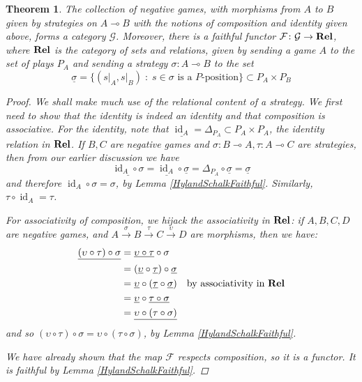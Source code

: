 \documentclass[11pt]{article} %
\theoremstyle{plain} %
\newtheorem{theorem}{Theorem}[section]
\theoremstyle{definition} %
\theoremstyle{note}
\theoremstyle{exercisestyle}
\newcommand{\catname}[1]{{\normalfont\textbf{#1}}}
\newcommand{\Rel}{\catname{Rel}}
\newcommand{\map}[3]{#2\xrightarrow{#1} #3}
\newcommand*\from{\colon}
\DeclareMathOperator{\id}{id}
\renewcommand{\implies}{\multimap}
\newcommand{\comp}[2]{#1 \circ #2}
\newcommand{\G}{\mathcal G}
\newcommand{\suchthat}{\;\colon\;}
\newcommand{\F}{\mathcal F}
\newcommand{\grel}[1]{\underline{#1}}
\begin{document}
\begin{theorem}
  The collection of negative games, with morphisms from $A$ to $B$ given by strategies on $A\implies B$ with the notions of composition and identity given above, forms a category $\G$.  Moreover, there is a faithful functor $\F\from\G\to\Rel$, where $\Rel$ is the category of sets and relations, given by sending a game $A$ to the set of plays $P_A$ and sending a strategy $\sigma\from A\implies B$ to the set
  \[
    \grel{\sigma}=\{(s\vert_A,s\vert_B)\suchthat \textrm{$s\in\sigma$ is a $P$-position}\}\subset P_A\times P_B
    \]
  \begin{proof}
    We shall make much use of the relational content of a strategy.  We first need to show that the identity is indeed an identity and that composition is associative.  For the identity, note that $\grel{\id_A}=\Delta_{P_A}\subset P_A\times P_A$, the identity relation in $\Rel$.  If $B,C$ are negative games and $\sigma\colon B\implies A,\tau\colon A\implies C$ are strategies, then from our earlier discussion we have
    \[
      \grel{\comp{\id_A}{\sigma}}=\comp{\grel{\id_A}}{\grel\sigma}=\comp{\Delta_{P_A}}{\grel\sigma}=\grel\sigma
      \]
    and therefore $\comp{\id_A}{\sigma}=\sigma$, by Lemma \ref{HylandSchalkFaithful}.  Similarly, $\comp{\tau}{\id_A}=\tau$.  

    For associativity of composition, we hijack the associativity in $\Rel$: if $A,B,C,D$ are negative games, and $\map{\sigma}AB\xrightarrow{\tau}\map{\upsilon}CD$ are morphisms, then we have:
    \begin{align*}
      \grel{\comp{(\comp\upsilon\tau)}{\sigma}} & = \comp{\grel{\comp\upsilon\tau}}{\sigma} \\
        & = \comp{(\comp{\grel\upsilon}{\grel\tau})}{\grel\sigma} \\
        & = \comp{\grel\upsilon}{(\comp{\grel\tau}{\grel\sigma})} \quad\textrm{by associativity in $\Rel$} \\
        & = \comp{\grel\upsilon}{\grel{\comp\tau\sigma}} \\
        & = \grel{\comp{\upsilon}{(\comp\tau\sigma)}}
    \end{align*}
    and so $\comp{(\comp\upsilon\tau)}{\sigma}=\comp{\upsilon}{(\comp\tau\sigma)}$, by Lemma \ref{HylandSchalkFaithful}.  

    We have already shown that the map $\F$ respects composition, so it is a functor.  It is faithful by Lemma \ref{HylandSchalkFaithful}.
  \end{proof}
\end{theorem}
\end{document}
